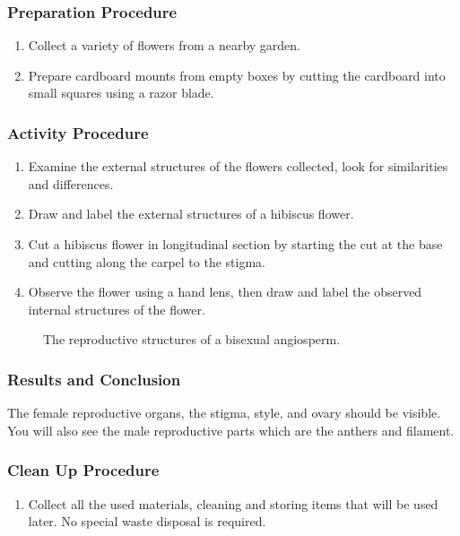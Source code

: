 \subsubsection*{Preparation Procedure}
\begin{enumerate}
\item{Collect a variety of flowers from a nearby garden.}
\item{Prepare cardboard mounts from empty boxes by cutting the cardboard into small squares using a razor blade.}
\end{enumerate}

\subsubsection*{Activity Procedure}
\begin{enumerate}
\item{Examine the external structures of the flowers collected, look for similarities and differences.}
\item{Draw and label the external structures of a hibiscus flower.}
\item{Cut a hibiscus flower in longitudinal section by starting the cut at the base and cutting along the carpel to the stigma.}
\item{Observe the flower using a hand lens, then draw and label the observed internal structures of the flower.}
\end{enumerate}

\begin{figure}[h]
\begin{center}
\def\svgwidth{9 cm}

\caption{The reproductive structures of a bisexual angiosperm.}
\label{fig:hibiscus}
\end{center}
\end{figure}

\subsubsection*{Results and Conclusion}
The female reproductive organs, the stigma, style, and ovary should be visible. You will also see the male reproductive parts which are the anthers and filament.

\subsubsection*{Clean Up Procedure}
\begin{enumerate}
\item{Collect all the used materials, cleaning and storing items that will be used later. No special waste disposal is required.}
\end{enumerate}

